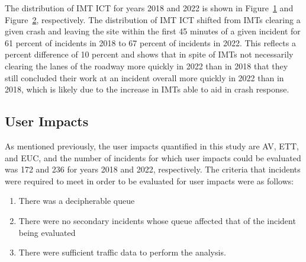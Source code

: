 \documentclass[
  letterpaper,
  authoryear]{elsarticle}
\begin{document}
The distribution of IMT ICT for years 2018 and 2022 is shown in
Figure~\ref{fig-ICT2018} and Figure~\ref{fig-ICT2022}, respectively. The
distribution of IMT ICT shifted from IMTs clearing a given crash and
leaving the site within the first 45 minutes of a given incident for 61
percent of incidents in 2018 to 67 percent of incidents in 2022. This
reflects a percent difference of 10 percent and shows that in spite of
IMTs not necessarily clearing the lanes of the roadway more quickly in
2022 than in 2018 that they still concluded their work at an incident
overall more quickly in 2022 than in 2018, which is likely due to the
increase in IMTs able to aid in crash response.

\begin{figure}


\caption{\label{fig-ICT2018}}

\end{figure}%

\begin{figure}


\caption{\label{fig-ICT2022}}

\end{figure}%

\subsection{User Impacts}\label{user-impacts}

As mentioned previously, the user impacts quantified in this study are
AV, ETT, and EUC, and the number of incidents for which user impacts
could be evaluated was 172 and 236 for years 2018 and 2022,
respectively. The criteria that incidents were required to meet in order
to be evaluated for user impacts were as follows:

\begin{enumerate}
\def\labelenumi{\arabic{enumi}.}
\item
  There was a decipherable queue
\item
  There were no secondary incidents whose queue affected that of the
  incident being evaluated
\item
  There were sufficient traffic data to perform the analysis.
\end{enumerate}
\end{document}
